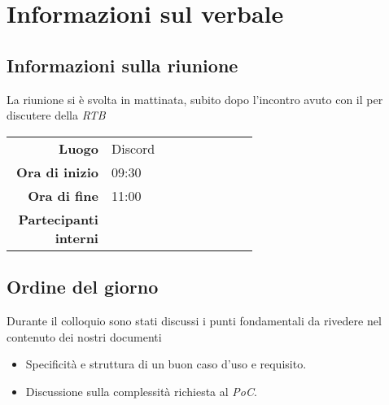 \section{Informazioni sul verbale}

\subsection{Informazioni sulla riunione}
La riunione si è svolta in mattinata, subito dopo l'incontro avuto con il \cardin per discutere della \textit{RTB}

\begin{center}
	\begin{tabular}{r|p{0.6\linewidth}}
		\toprule
		\textbf{Luogo} & Discord \\
		\textbf{Ora di inizio} & 09:30 \\
		\textbf{Ora di fine} & 11:00 \\
		\textbf{Partecipanti interni} & \groupTeam
	\end{tabular}
\end{center}

\medskip

\subsection{Ordine del giorno}
Durante il colloquio sono stati discussi i punti fondamentali da rivedere nel contenuto dei nostri documenti
\begin{itemize}
	\item Specificità e struttura di un buon caso d'uso e requisito.
	\item Discussione sulla complessità richiesta al \textit{PoC}.
\end{itemize}